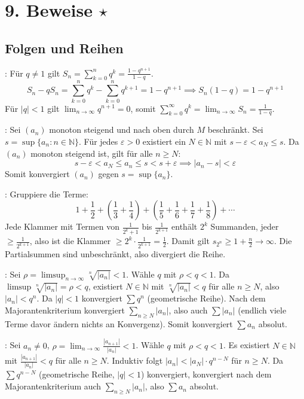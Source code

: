 \section{9. Beweise \texorpdfstring{$\star$}{*}}

\subsection{Folgen und Reihen}

\Bew {}: Für $q \neq 1$ gilt $S_n = \sum_{k=0}^n q^k = \frac{1 - q^{n+1}}{1 - q}$. 
$$S_n - q S_n = \sum_{k=0}^n q^k - \sum_{k=0}^n q^{k+1} = 1 - q^{n+1} \implies S_n(1 - q) = 1 - q^{n+1}$$
Für $|q| < 1$ gilt $\lim_{n\to\infty} q^{n+1} = 0$, somit $\sum_{k=0}^\infty q^k = \lim_{n\to\infty} S_n = \frac{1}{1 - q}$.

\Bew {}: Sei $(a_n)$ monoton steigend und nach oben durch $M$ beschränkt. Sei $s = \sup\{a_n : n \in \mathbb{N}\}$. 
Für jedes $\varepsilon > 0$ existiert ein $N \in \mathbb{N}$ mit $s - \varepsilon < a_N \le s$. 
Da $(a_n)$ monoton steigend ist, gilt für alle $n \ge N$:
$$s - \varepsilon < a_N \le a_n \le s < s + \varepsilon \implies |a_n - s| < \varepsilon$$
Somit konvergiert $(a_n)$ gegen $s = \sup \{a_n\}$.

\Bew {}: Gruppiere die Terme:
$$1 + \frac{1}{2} + \left(\frac{1}{3}+\frac{1}{4}\right) + \left(\frac{1}{5}+\frac{1}{6}+\frac{1}{7}+\frac{1}{8}\right) + \cdots$$
Jede Klammer mit Termen von $\frac{1}{2^k+1}$ bis $\frac{1}{2^{k+1}}$ enthält $2^k$ Summanden, jeder $\ge \frac{1}{2^{k+1}}$,
also ist die Klammer $\ge 2^k \cdot \frac{1}{2^{k+1}} = \frac{1}{2}$.
Damit gilt $s_{2^n} \ge 1 + \frac{n}{2} \to \infty$. Die Partialsummen sind unbeschränkt, also divergiert die Reihe.

\Bew {}: Sei $\rho = \limsup_{n\to\infty} \sqrt[n]{|a_n|} < 1$. Wähle $q$ mit $\rho < q < 1$.
Da $\limsup \sqrt[n]{|a_n|} = \rho < q$, existiert $N \in \mathbb{N}$ mit $\sqrt[n]{|a_n|} < q$ für alle $n \ge N$, also $|a_n| < q^n$.
Da $|q| < 1$ konvergiert $\sum q^n$ (geometrische Reihe). Nach dem Majorantenkriterium konvergiert $\sum_{n \ge N} |a_n|$,
also auch $\sum |a_n|$ (endlich viele Terme davor ändern nichts an Konvergenz). Somit konvergiert $\sum a_n$ absolut.

\Bew {}: Sei $a_n \neq 0$, $\rho = \lim_{n\to\infty} \frac{|a_{n+1}|}{|a_n|} < 1$. Wähle $q$ mit $\rho < q < 1$.
Es existiert $N \in \mathbb{N}$ mit $\frac{|a_{n+1}|}{|a_n|} < q$ für alle $n \ge N$.
Induktiv folgt $|a_n| < |a_N| \cdot q^{n-N}$ für $n \ge N$.
Da $\sum q^{n-N}$ (geometrische Reihe, $|q|<1$) konvergiert, konvergiert nach dem Majorantenkriterium auch $\sum_{n \ge N} |a_n|$,
also $\sum a_n$ absolut.

